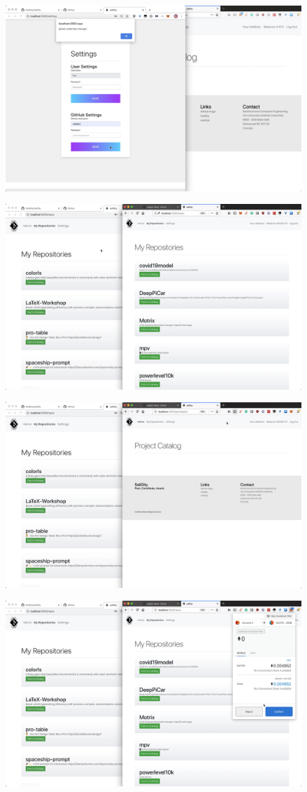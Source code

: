 \documentclass[12pt]{article}
\renewcommand{\_}{\kern-1.5pt\textunderscore\kern-1.5pt}
\begin{document}
\includegraphics[height=7cm]{graphs/20. bob_gitub_setup}

\includegraphics[height=7cm]{graphs/21. alice_bob_repos}

\includegraphics[height=7cm]{graphs/22. empty_project_catalog}

\includegraphics[height=7cm]{graphs/23. alice_post_to_catalog_1}
\end{document}
